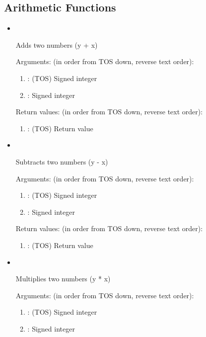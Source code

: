 \subsection{Arithmetic Functions}
\begin{itemize}

\item \forthinlinehl{+}\ 

\noindent Adds two numbers (y + x)

\noindent Arguments: (in order from TOS down, reverse text order):
\begin{enumerate}
\item {}: (TOS) Signed integer
\item {}: Signed integer
\end{enumerate}

\noindent Return values: (in order from TOS down, reverse text order):
\begin{enumerate}
\item {}: (TOS) Return value
\end{enumerate}

\item \forthinlinehl{-}\ 

\noindent Subtracts two numbers (y - x)

\noindent Arguments: (in order from TOS down, reverse text order):
\begin{enumerate}
\item {}: (TOS) Signed integer
\item {}: Signed integer
\end{enumerate}

\noindent Return values: (in order from TOS down, reverse text order):
\begin{enumerate}
\item {}: (TOS) Return value
\end{enumerate}

\item \forthinlinehl{*}\ 

\noindent Multiplies two numbers (y * x)

\noindent Arguments: (in order from TOS down, reverse text order):
\begin{enumerate}
\item {}: (TOS) Signed integer
\item {}: Signed integer
\end{enumerate}


\end{itemize}

